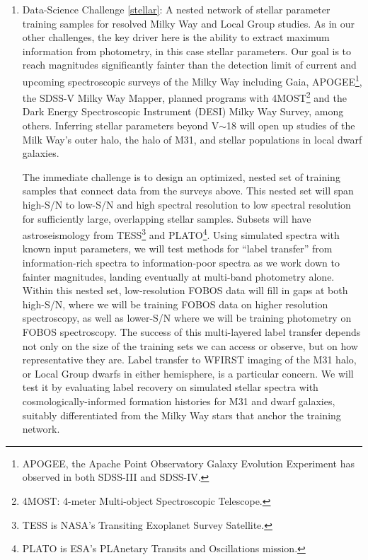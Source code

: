 \documentclass[oneside,11pt]{amsart}
\newcounter{chalno}
\newcommand{\chal}[1]{\refstepcounter{chalno}\label{#1}}
\begin{document}
\begin{enumerate}[rightmargin=0.2cm,leftmargin=0.2cm]

\chal{stellar} 
%
\item[] {\textsf {\large  Data-Science Challenge \ref{stellar}: A nested network of stellar parameter training
samples for resolved Milky Way and Local Group studies.}}  As in our other challenges, the key driver here is the
ability to extract maximum information from photometry, in this case stellar parameters.  Our goal is to reach
magnitudes significantly fainter than the detection limit of current and upcoming spectroscopic surveys of the Milky
Way including Gaia, APOGEE\footnote{APOGEE, the Apache Point Observatory Galaxy Evolution Experiment has observed in
both SDSS-III and SDSS-IV.}, the SDSS-V Milky Way Mapper, planned programs with 4MOST\footnote{4MOST: 4-meter
Multi-object Spectroscopic Telescope.} and the Dark Energy Spectroscopic Instrument (DESI) Milky Way Survey, among
others. Inferring
stellar parameters beyond V$\sim$18 will open up studies of the Milk Way's outer halo, the halo of M31, and stellar
populations in local dwarf galaxies.

The immediate challenge is to design an optimized, nested set of training samples that connect data from the surveys
above.  This nested set will span high-S/N to low-S/N and high spectral resolution to low spectral resolution for
sufficiently large, overlapping stellar samples.  Subsets will have astroseismology from TESS\footnote{TESS is NASA's
Transiting Exoplanet Survey Satellite.} and PLATO\footnote{PLATO is ESA's PLAnetary Transits and Oscillations
mission.}.  Using simulated spectra with known input parameters, we will test methods for ``label transfer'' from
information-rich spectra to information-poor spectra as we work down to fainter magnitudes, landing eventually at
multi-band photometry alone. Within this nested set, low-resolution FOBOS data will fill in gaps at both high-S/N,
where we will be training FOBOS data on higher resolution spectroscopy, as well as lower-S/N where we will be training
photometry on FOBOS spectroscopy.  The success of this multi-layered label transfer depends not only on the size of the
training sets we can access or observe, but on how representative they are.  Label transfer to WFIRST imaging of the
M31 halo, or Local Group dwarfs in either hemisphere, is a particular concern.  We will test it by evaluating label
recovery on simulated stellar spectra with cosmologically-informed formation histories for M31 and dwarf galaxies,
suitably differentiated from the Milky Way stars that anchor the training network.




\end{enumerate}
\end{document}
